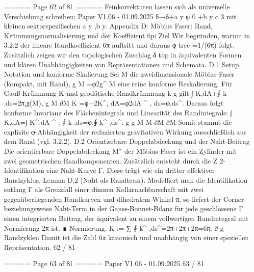 \begin{MyVerbatim}
{{===== Page 62 of 81 =====
Feinkorrekturen lassen sich als universelle Verschiebung schreiben:
Paper V1.06 - 01.09.2025
δ→δ+a y φ 0 +b y c 3 mit kleinen sektorspezifischen a y ,b y.
Appendix D: Möbius Faser: Rand, Krümmungsnormalisierung und der
Koeffizient 6pi
Ziel
Wir begründen, warum in 3.2.2 der lineare Randkoeffizient 6π auftritt und daraus φ tree =1/(6π) folgt. Zusätzlich zeigen
wir den topologischen Zuschlag δ top in äquivalenten Formen und klären Unabhängigkeiten von Repräsentationen und
Schemata.
D.1 Setup, Notation und konforme Skalierung
Sei M die zweidimensionale Möbius-Faser (kompakt, mit Rand), g M =φ2g^ M eine reine konforme Reskalierung. Für
Gauß-Krümmung K und geodätische Randkrümmung k g gilt
∫ K,dA+∮ k ,ds=2π,χ(M),
g
M ∂M
K =φ−2K^, dA=φ2dA ^ , ds=φ,ds^.
Daraus folgt konforme Invarianz des Flächenintegrals und Linearität des Randintegrals:
∫ K,dA=∫ K^,dA ^ , ∮ k ,ds=φ,∮ k^ ,ds^.
g g
M M ∂M ∂M
Somit stammt die explizite φ-Abhängigkeit der reduzierten gravitativen Wirkung ausschließlich aus dem Rand (vgl. 3.2.2).
D.2 Orientierbare Doppelabdeckung und der Naht-Beitrag
Die orientierbare Doppelabdeckung
M˜
der Möbius-Faser ist ein Zylinder mit zwei geometrischen Randkomponenten.
Zusätzlich entsteht durch die Z 2-Identifikation eine Naht-Kurve Γ. Diese trägt wie ein dritter effektiver Randzyklus.
Lemma D.2 (Naht als Randterm). Modelliert man die Identifikation entlang Γ als Grenzfall einer dünnen
Kollarnachbarschaft mit zwei gegenüberliegenden Randkurven und dihedralem Winkel π, so liefert der Corner-
beziehungsweise Naht-Term in der Gauss-Bonnet-Bilanz für jede geschlossene Γ einen integrierten Beitrag, der
äquivalent zu einem vollwertigen Randintegral mit Normierung 2π ist. ∎
Normierung.
K := ∑ ∮ k^ ,ds^=2π+2π+2π=6π.
∂ g
Randzyklen
Damit ist die Zahl 6π kanonisch und unabhängig von einer speziellen Repräsentation.
62 / 81

===== Page 63 of 81 =====
Paper V1.06 - 01.09.2025
63 / 81

}}
\end{MyVerbatim}
